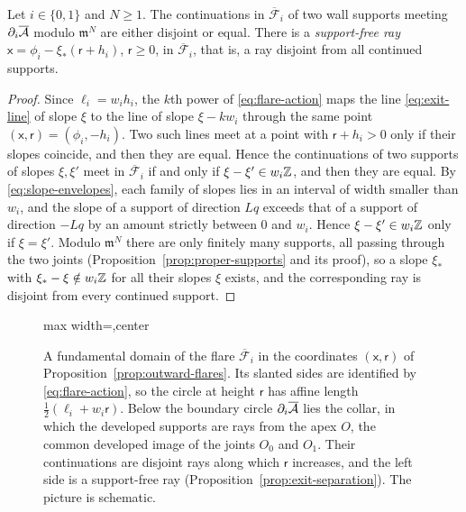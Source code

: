 \begin{proposition}\label{prop:exit-separation}
Let $i\in\{0,1\}$ and $N\geq1$.  The continuations in
$\overline{\mathcal F}_i$ of two wall supports meeting
$\partial_i\overline{\mathcal A}$ modulo $\mathfrak m^N$ are either disjoint or
equal.  There is a \emph{support-free ray}
$\mathsf x=\phi_i-\xi_*(\mathsf r+h_i)$, $\mathsf r\geq0$, in
$\overline{\mathcal F}_i$, that is, a ray disjoint from all continued
supports.
\end{proposition}

\begin{proof}
Since $\ell_i=w_ih_i$, the $k$th power of \eqref{eq:flare-action} maps the
line \eqref{eq:exit-line} of slope $\xi$ to the line of slope
$\xi-kw_i$ through the same point $(\mathsf x,\mathsf r)=(\phi_i,-h_i)$.
Two such lines meet at a point with $\mathsf r+h_i>0$ only if their slopes
coincide, and then they are equal.  Hence the continuations of two
supports of slopes $\xi,\xi'$
meet in $\overline{\mathcal F}_i$ if and only if
$\xi-\xi'\in w_i\mathbb Z$, and then they are equal.  By
\eqref{eq:slope-envelopes}, each family of slopes lies in an interval of
width smaller than $w_i$, and the slope of a support of direction $Lq$
exceeds that of a support of direction $-Lq$ by an amount strictly between
$0$ and $w_i$.  Hence
$\xi-\xi'\in w_i\mathbb Z$ only if $\xi=\xi'$.  Modulo $\mathfrak m^N$ there are
only finitely many supports, all passing through the two joints
(Proposition~\ref{prop:proper-supports} and its proof), so a slope $\xi_*$ with
$\xi_*-\xi\notin w_i\mathbb Z$ for all their slopes $\xi$ exists, and the
corresponding ray is disjoint from every continued support.
\end{proof}

\begin{figure}[t]
\centering
\vspace{0.5\baselineskip}
\begin{adjustbox}{max width=\textwidth,center}

\end{adjustbox}
\caption{A fundamental domain of the flare $\overline{\mathcal F}_i$ in the
coordinates $(\mathsf x,\mathsf r)$ of
Proposition~\ref{prop:outward-flares}.  Its slanted sides are identified by
\eqref{eq:flare-action}, so the circle at height $\mathsf r$ has affine
length $\frac12(\ell_i+w_i\mathsf r)$.  Below the boundary circle
$\partial_i\overline{\mathcal A}$ lies the collar, in which the developed supports
are rays from the apex $O$, the common developed image of the joints $O_0$
and $O_1$.  Their continuations are disjoint rays along which $\mathsf r$
increases, and the left side is a support-free ray
(Proposition~\ref{prop:exit-separation}).  The picture is schematic.}
\label{fig:outward-flare}
\end{figure}

